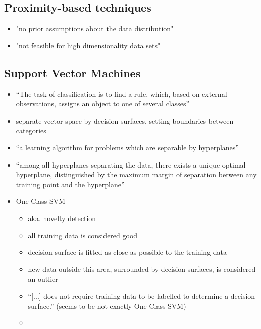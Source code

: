 \subsection{Proximity-based techniques}
\label{sec:background:network:novelty:prox}
	
	\begin{itemize}
		\item "no prior assumptions about the data distribution" \parencite{Hodge2004}
		\item "not feasible for high dimensionality data sets" \parencite{Hodge2004}
		
	\end{itemize}

\subsection{Support Vector Machines}
\label{sec:background:network:novelty:svm}
	
	\begin{itemize}
		\item \enquote{The task of classification is to find a rule, which, based on external observations, assigns an object to one of several classes} \parencite{Muller2001}
		\item separate vector space by decision surfaces, setting boundaries between categories \parencite{Muller2001}
		\item \enquote{a learning algorithm for problems which are separable by hyperplanes} \parencite{Scholkopf2001a}
		\item \enquote{among all hyperplanes separating the data, there exists a unique optimal hyperplane, distinguished by the maximum margin of separation between any training point and the hyperplane} \parencite{Scholkopf2001a}
		
		\item One Class SVM
			\begin{itemize}
				\item aka. novelty detection
				\item all training data is considered good
				\item decision surface is fitted as close as possible to the training data
				\item new data outside this area, surrounded by decision surfaces, is considered an outlier
				\item \enquote{[...] does not require training data to be labelled to determine a decision surface.} \parencite{Lazarevic2003} (seems to be not exactly One-Class SVM)
				\item 
			\end{itemize}
	\end{itemize}
	

